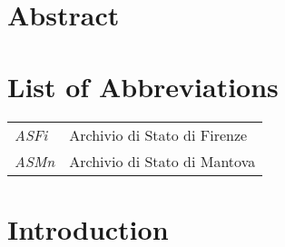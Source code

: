 \documentclass[12pt,letterpaper,oneside,final]{memoir}
\makeatletter
\newcommand{\listofappendices}{\bgroup%
  \renewcommand\contentsname{List of Appendices}
  \let\@startoc@temp\@starttoc%
  \def\@starttoc##1{\@startoc@temp{app}}%
  \clearpage
  \tableofcontents* \egroup
}
\makeatother
\begin{document}

\newpage


\chapter{Abstract}
\DoubleSpacing
\noindent

\clearpage


\setcounter{tocdepth}{2} %

\begin{KeepFromToc}
\tableofcontents
\end{KeepFromToc}

\clearpage

\newpage

\clearpage


\listoffigures


\chapter{List of Abbreviations}

\SingleSpacing

\begin{longtable}{ll}

\emph{ASFi} & Archivio di Stato di Firenze\\ %
\emph{ASMn} & Archivio di Stato di Mantova\\ %
\end{longtable}

\clearpage


\listofappendices%
\DoubleSpacing
\mainmatter
\clearpage
\cleardoublepage  
{}

\chapter[Introduction]{Introduction}

\end{document}
